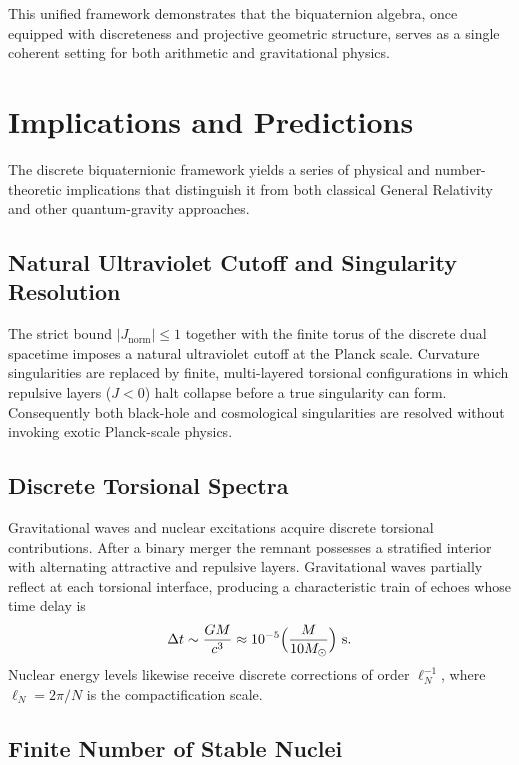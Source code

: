 \documentclass[a4paper]{article}
\theoremstyle{definition}
\theoremstyle{remark}
\newcommand{\Jnorm}{J_{\mathrm{norm}}}
\begin{document}
This unified framework demonstrates that the biquaternion algebra, once equipped with discreteness and projective geometric structure, serves as a single coherent setting for both arithmetic and gravitational physics.

\section{Implications and Predictions}

The discrete biquaternionic framework yields a series of physical and number-theoretic implications that distinguish it from both classical General Relativity and other quantum-gravity approaches.

\subsection{Natural Ultraviolet Cutoff and Singularity Resolution}

The strict bound \( |\Jnorm| \leq 1 \) together with the finite torus of the discrete dual spacetime imposes a natural ultraviolet cutoff at the Planck scale. Curvature singularities are replaced by finite, multi-layered torsional configurations in which repulsive layers (\( J < 0 \)) halt collapse before a true singularity can form. Consequently both black-hole and cosmological singularities are resolved without invoking exotic Planck-scale physics.

\subsection{Discrete Torsional Spectra}

Gravitational waves and nuclear excitations acquire discrete torsional contributions. After a binary merger the remnant possesses a stratified interior with alternating attractive and repulsive layers. Gravitational waves partially reflect at each torsional interface, producing a characteristic train of echoes whose time delay is
\[
\Delta t \sim \frac{GM}{c^3} \approx 10^{-5} \Bigl( \frac{M}{10 M_\odot} \Bigr) \text{ s}.
\]
Nuclear energy levels likewise receive discrete corrections of order \( \ell_N^{-1} \), where \( \ell_N = 2\pi / N \) is the compactification scale.

\subsection{Finite Number of Stable Nuclei}
\end{document}

